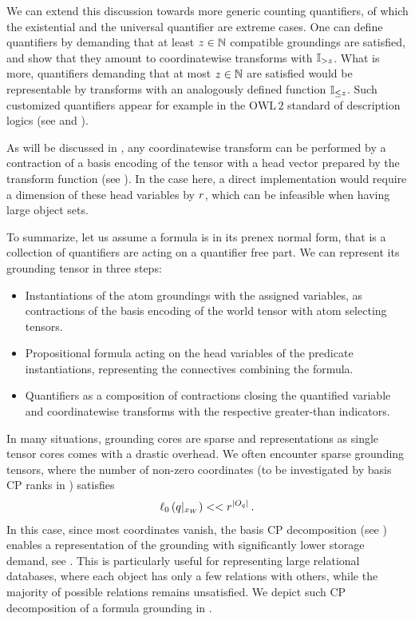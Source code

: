 We can extend this discussion towards more generic counting quantifiers, of which the existential and the universal quantifier are extreme cases.
One can define quantifiers by demanding that at least $z\in\mathbb{N}$ compatible groundings are satisfied, and show that they amount to coordinatewise transforms with $\mathbb{I}_{>z}$.
What is more, quantifiers demanding that at most $z\in\mathbb{N}$ are satisfied would be representable by transforms with an analogously defined function $\mathbb{I}_{\leq z}$.
Such customized quantifiers appear for example in the $\mathrm{OWL\,2}$ standard of description logics (see \cite{rudolph_foundations_2011} and ).

As will be discussed in , any coordinatewise transform can be performed by a contraction of a basis encoding of the tensor with a head vector prepared by the transform function (see ).
In the case here, a direct implementation would require a dimension of these head variables by $r$, which can be infeasible when having large object sets.

To summarize, let us assume a formula is in its prenex normal form, that is a collection of quantifiers are acting on a quantifier free part.
We can represent its grounding tensor in three steps:
\begin{itemize}
    \item Instantiations of the atom groundings with the assigned variables, as contractions of the basis encoding of the world tensor with atom selecting tensors.
    \item Propositional formula acting on the head variables of the predicate instantiations, representing the connectives combining the formula.
    \item Quantifiers as a composition of contractions closing the quantified variable and coordinatewise transforms with the respective greater-than indicators.
\end{itemize}



\label{sec:basisCPgrounding}

In many situations, grounding cores are sparse and representations as single tensor cores comes with a drastic overhead.
We often encounter sparse grounding tensors, where the number of non-zero coordinates (to be investigated by basis CP ranks in ) satisfies
\begin{align*}
    \ell_0\left({q}|_{x_{W}}\right) << r^{\left|O_{q}\right|} \, .
\end{align*}
In this case, since most coordinates vanish, the basis CP decomposition (see ) enables a representation of the grounding with significantly lower storage demand, see .
This is particularly useful for representing large relational databases, where each object has only a few relations with others, while the majority of possible relations remains unsatisfied.
We depict such CP decomposition of a formula grounding in .

